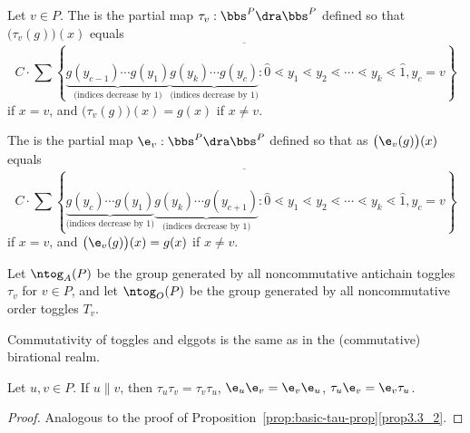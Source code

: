 \begin{defi}
Let $v\in P$. The  is the partial map $\tau_v:\bbs^P \dra \bbs^P$ defined so that $\big(\tau_v(g)\big)(x)$ equals
\[
C \cdot \overline{
\sum\left\{\underbrace{g(y_{c-1})\cdots g(y_1)}_{\text{(indices decrease by 1)}}
\underbrace{g(y_{k})\cdots g(y_c)}_{\text{(indices decrease by 1)}} : \widehat{0}\lessdot y_1\lessdot y_2 \lessdot
\cdots \lessdot y_k\lessdot \widehat{1}, y_c=v
\right\}}
\]
if $x=v$, and $\big(\tau_v(g)\big)(x)=g(x)$ if $x\not=v$.

The  is the partial map $\e_v:\bbs^P \dra \bbs^P$ defined so that as $\big(\e_v(g)\big)(x)$ equals
\[
C \cdot \overline{
\sum\left\{\underbrace{g(y_c)\cdots g(y_1)}_{\text{(indices decrease by 1)}}
\underbrace{g(y_{k})\cdots g(y_{c+1})}_{\text{(indices decrease by 1)}} : \widehat{0}\lessdot y_1\lessdot y_2
\lessdot
\cdots \lessdot y_k\lessdot \widehat{1}, y_c=v
\right\}}
\] 
if $x=v$, and $\big(\e_v(g)\big)(x)=g(x)$ if $x\not=v$.

Let $\ntog_A(P)$ be the group generated by all noncommutative antichain toggles $\tau_v$ for $v\in P$, and let $\ntog_O(P)$ be the group generated by all noncommutative order toggles $T_v$.
\end{defi}

Commutativity of toggles and elggots is the same as in the (commutative) birational realm.

\begin{prop}
Let $u,v\in P$. If $u \parallel v$, then
$\tau_u \tau_v= \tau_v \tau_u$, $ \e_u \e_v= \e_v \e_u$, $ \tau_u \e_v= \e_v \tau_u$.
\end{prop}
\begin{proof}
Analogous to the proof of Proposition~\ref{prop:basic-tau-prop}\ref{prop3.3_2}. 
\end{proof}



